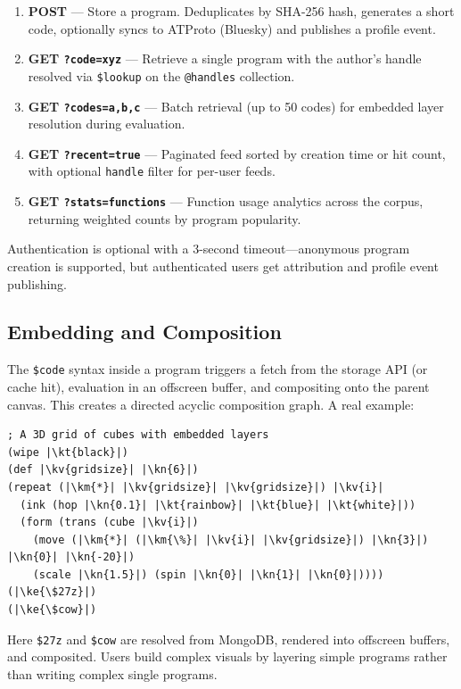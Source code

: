 \documentclass[10pt,letterpaper,twocolumn]{article}
\newcommand{\kn}[1]{\textcolor{klnum}{#1}}
\newcommand{\kt}[1]{\textcolor{klstr}{#1}}
\newcommand{\kv}[1]{\textcolor{klvar}{#1}}
\newcommand{\ke}[1]{\textcolor{klembed}{\textbf{#1}}}
\newcommand{\km}[1]{\textcolor{klmath}{#1}}
\begin{document}
\begin{enumerate}
  \item \textbf{POST} --- Store a program. Deduplicates by SHA-256 hash, generates a short code, optionally syncs to ATProto (Bluesky) and publishes a profile event.
  \item \textbf{GET \texttt{?code=xyz}} --- Retrieve a single program with the author's handle resolved via \texttt{\$lookup} on the \texttt{@handles} collection.
  \item \textbf{GET \texttt{?codes=a,b,c}} --- Batch retrieval (up to 50 codes) for embedded layer resolution during evaluation.
  \item \textbf{GET \texttt{?recent=true}} --- Paginated feed sorted by creation time or hit count, with optional \texttt{handle} filter for per-user feeds.
  \item \textbf{GET \texttt{?stats=functions}} --- Function usage analytics across the corpus, returning weighted counts by program popularity.
\end{enumerate}

Authentication is optional with a 3-second timeout---anonymous program creation is supported, but authenticated users get attribution and profile event publishing.

\subsection{Embedding and Composition}

The \texttt{\$code} syntax inside a program triggers a fetch from the storage API (or cache hit), evaluation in an offscreen buffer, and compositing onto the parent canvas. This creates a directed acyclic composition graph. A real example:

\begin{lstlisting}
; A 3D grid of cubes with embedded layers
(wipe |\kt{black}|)
(def |\kv{gridsize}| |\kn{6}|)
(repeat (|\km{*}| |\kv{gridsize}| |\kv{gridsize}|) |\kv{i}|
  (ink (hop |\kn{0.1}| |\kt{rainbow}| |\kt{blue}| |\kt{white}|))
  (form (trans (cube |\kv{i}|)
    (move (|\km{*}| (|\km{\%}| |\kv{i}| |\kv{gridsize}|) |\kn{3}|) |\kn{0}| |\kn{-20}|)
    (scale |\kn{1.5}|) (spin |\kn{0}| |\kn{1}| |\kn{0}|))))
(|\ke{\$27z}|)
(|\ke{\$cow}|)
\end{lstlisting}

Here \texttt{\$27z} and \texttt{\$cow} are resolved from MongoDB, rendered into offscreen buffers, and composited. Users build complex visuals by layering simple programs rather than writing complex single programs.
\end{document}
